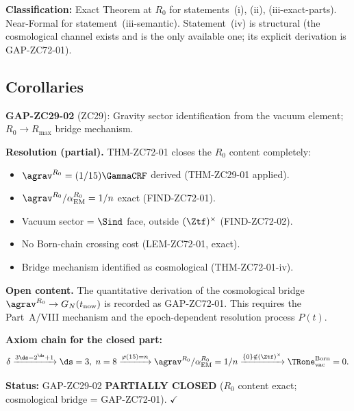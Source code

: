 \documentclass[12pt, a4paper]{article}
\renewcommand{\aEM}{\alpha_{\rm EM}}
\begin{document}
\begin{formalbox}[title={THM-ZC72-01: Vacuum Sector Theorem
  ($R_0$, Exact; Bridge Open)}]
\textbf{Classification:} Exact Theorem at $R_0$ for
statements~(i), (ii), (iii-exact-parts).
Near-Formal for statement~(iii-semantic).
Statement~(iv) is structural (the cosmological channel exists
and is the only available one; its explicit derivation is
GAP-ZC72-01).
\end{formalbox}

\subsection{Corollaries}
\label{sec:cors}


\begin{formalbox}[title={COR-ZC72-01: GAP-ZC29-02 PARTIALLY CLOSED
  ($R_0$, Exact; Cosmological Bridge Open)}]

\textbf{GAP-ZC29-02} (ZC29): Gravity sector identification from
the vacuum element; $R_0 \to R_{\max}$ bridge mechanism.

\textbf{Resolution (partial).}
THM-ZC72-01 closes the $R_0$ content completely:
\begin{itemize}[leftmargin=2em, noitemsep]
  \item $\agrav^{R_0} = (1/15)\GammaCRF$ derived (THM-ZC29-01 applied).
  \item $\agrav^{R_0}/\aEM^{R_0} = 1/n$ exact (FIND-ZC72-01).
  \item Vacuum sector = $\Sind$ face, outside $(\Ztf)^\times$
    (FIND-ZC72-02).
  \item No Born-chain crossing cost (LEM-ZC72-01, exact).
  \item Bridge mechanism identified as cosmological (THM-ZC72-01-iv).
\end{itemize}

\textbf{Open content.}
The quantitative derivation of the cosmological bridge
$\agrav^{R_0} \to G_N(t_{\rm now})$ is recorded as GAP-ZC72-01.
This requires the Part~A/VIII mechanism and the epoch-dependent
resolution process $P(t)$.

\textbf{Axiom chain for the closed part:}
\[
  \delta
  \xrightarrow{3\ds = 2^{\ds}+1}
  \ds = 3,\; n = 8
  \xrightarrow{\varphi(15) = n}
  \agrav^{R_0}/\aEM^{R_0} = 1/n
  \xrightarrow{\{0\}\notin(\Ztf)^\times}
  \TRone_{\rm vac}^{\rm Born} = 0.
\]

\textbf{Status:} GAP-ZC29-02 \textbf{PARTIALLY CLOSED}
($R_0$ content exact; cosmological bridge = GAP-ZC72-01). $\checkmark$
\end{formalbox}
\end{document}
